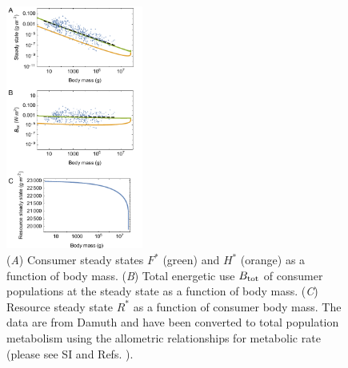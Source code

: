 \documentclass[twocolumn,preprintnumbers,amsmath,amssymb,superscriptaddress]{revtex4}
\begin{document}
\begin{bibunit}[unsrt]
\begin{figure}
\centering
\includegraphics[width=0.4\textwidth]{fig_FPAllometric.pdf}
\caption{ (\emph{A}) Consumer steady states $F^*$ (green) and $H^*$ (orange) as a function of
  body mass.
  (\emph{B}) Total energetic use $B_{\rm tot}$ of consumer populations at the steady state as a function of body mass.
  (\emph{C}) Resource steady state $R^*$ as a function of consumer body mass. The data are from Damuth \cite{Damuth:1987kr} and have been converted to total population metabolism using the allometric relationships for metabolic rate (please see SI and Refs. \cite{West:2001bv,hou,moses2008rmo}).}
\label{fig:mass}
\end{figure}


\end{bibunit}
\end{document}
